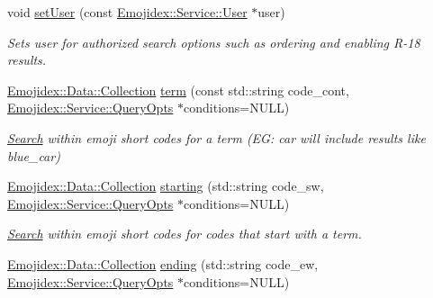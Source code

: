 \begin{DoxyCompactItemize}
\item 
void \hyperlink{classEmojidex_1_1Service_1_1Search_ac29e36bb5aed38c8443b4457691a3e7a}{set\+User} (const \hyperlink{classEmojidex_1_1Service_1_1User}{Emojidex\+::\+Service\+::\+User} $\ast$user)\hypertarget{classEmojidex_1_1Service_1_1Search_ac29e36bb5aed38c8443b4457691a3e7a}{}\label{classEmojidex_1_1Service_1_1Search_ac29e36bb5aed38c8443b4457691a3e7a}

\begin{DoxyCompactList}\small\item\em Sets user for authorized search options such as ordering and enabling R-\/18 results. \end{DoxyCompactList}\item 
\hyperlink{classEmojidex_1_1Data_1_1Collection}{Emojidex\+::\+Data\+::\+Collection} \hyperlink{classEmojidex_1_1Service_1_1Search_a7e9de234cfa8cdfe52b9ad02778ec096}{term} (const std\+::string code\+\_\+cont, \hyperlink{classEmojidex_1_1Service_1_1QueryOpts}{Emojidex\+::\+Service\+::\+Query\+Opts} $\ast$conditions=N\+U\+LL)\hypertarget{classEmojidex_1_1Service_1_1Search_a7e9de234cfa8cdfe52b9ad02778ec096}{}\label{classEmojidex_1_1Service_1_1Search_a7e9de234cfa8cdfe52b9ad02778ec096}

\begin{DoxyCompactList}\small\item\em \hyperlink{classEmojidex_1_1Service_1_1Search}{Search} within emoji short codes for a term (EG\+: \textquotesingle{}car\textquotesingle{} will include results like \textquotesingle{}blue\+\_\+car\textquotesingle{}) \end{DoxyCompactList}\item 
\hyperlink{classEmojidex_1_1Data_1_1Collection}{Emojidex\+::\+Data\+::\+Collection} \hyperlink{classEmojidex_1_1Service_1_1Search_a7b90f2dab9c28d2dc971bb7494b4d291}{starting} (std\+::string code\+\_\+sw, \hyperlink{classEmojidex_1_1Service_1_1QueryOpts}{Emojidex\+::\+Service\+::\+Query\+Opts} $\ast$conditions=N\+U\+LL)\hypertarget{classEmojidex_1_1Service_1_1Search_a7b90f2dab9c28d2dc971bb7494b4d291}{}\label{classEmojidex_1_1Service_1_1Search_a7b90f2dab9c28d2dc971bb7494b4d291}

\begin{DoxyCompactList}\small\item\em \hyperlink{classEmojidex_1_1Service_1_1Search}{Search} within emoji short codes for codes that start with a term. \end{DoxyCompactList}\item 
\hyperlink{classEmojidex_1_1Data_1_1Collection}{Emojidex\+::\+Data\+::\+Collection} \hyperlink{classEmojidex_1_1Service_1_1Search_a0c8100ad888ab404088cd44b07bc8b91}{ending} (std\+::string code\+\_\+ew, \hyperlink{classEmojidex_1_1Service_1_1QueryOpts}{Emojidex\+::\+Service\+::\+Query\+Opts} $\ast$conditions=N\+U\+LL)\hypertarget{classEmojidex_1_1Service_1_1Search_a0c8100ad888ab404088cd44b07bc8b91}{}\label{classEmojidex_1_1Service_1_1Search_a0c8100ad888ab404088cd44b07bc8b91}


\end{DoxyCompactItemize}
